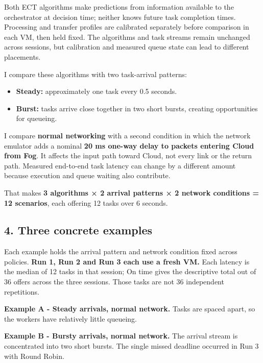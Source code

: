 \documentclass[11pt,a4paper]{article}
\begin{document}
Both ECT algorithms make predictions from information available to the
orchestrator at decision time; neither knows future task completion
times. Processing and transfer profiles are calibrated separately before
comparison in each VM, then held fixed. The algorithms and task streams
remain unchanged across sessions, but calibration and measured queue
state can lead to different placements.

I compare these algorithms with two task-arrival patterns:

\begin{itemize}
\tightlist
\item
  \textbf{Steady:} approximately one task every 0.5 seconds.
\item
  \textbf{Burst:} tasks arrive close together in two short bursts,
  creating opportunities for queueing.
\end{itemize}

I compare \textbf{normal networking} with a second condition in which
the network emulator adds a nominal \textbf{20 ms one-way delay to
packets entering Cloud from Fog}. It affects the input path toward
Cloud, not every link or the return path. Measured end-to-end task
latency can change by a different amount because execution and queue
waiting also contribute.

That makes \textbf{3 algorithms × 2 arrival patterns × 2 network
conditions = 12 scenarios}, each offering 12 tasks over 6 seconds.

\subsection{4. Three concrete examples}\label{three-concrete-examples}

Each example holds the arrival pattern and network condition fixed
across policies. \textbf{Run 1, Run 2 and Run 3 each use a fresh VM.}
Each latency is the median of 12 tasks in that session;
\textquotesingle On time\textquotesingle{} gives the descriptive total
out of 36 offers across the three sessions. Those tasks are not 36
independent repetitions.

\Needspace{230pt}

\textbf{Example A - Steady arrivals, normal network.} Tasks are spaced
apart, so the workers have relatively little queueing.



\Needspace{230pt}

\textbf{Example B - Bursty arrivals, normal network.} The arrival stream
is concentrated into two short bursts. The single missed deadline
occurred in Run 3 with Round Robin.
\end{document}

